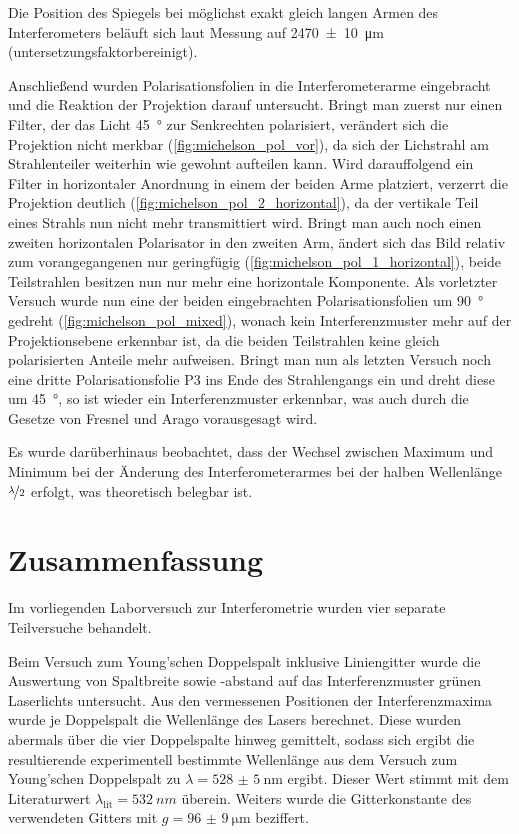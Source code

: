 \documentclass[ngerman]{scrartcl}
\begin{document}
Die Position des Spiegels bei möglichst exakt gleich langen Armen des Interferometers beläuft sich laut Messung auf \SI{2470(10)}{\micro\meter} (untersetzungsfaktorbereinigt).

Anschließend wurden Polarisationsfolien in die Interferometerarme eingebracht und die Reaktion der Projektion darauf untersucht. Bringt man zuerst nur einen Filter, der das Licht \SI{45}{\degree} zur Senkrechten polarisiert, verändert sich die Projektion nicht merkbar (\autoref{fig:michelson_pol_vor}), da sich der Lichstrahl am Strahlenteiler weiterhin wie gewohnt aufteilen kann. Wird darauffolgend ein Filter in horizontaler Anordnung in einem der beiden Arme platziert, verzerrt die Projektion deutlich (\autoref{fig:michelson_pol_2_horizontal}), da der vertikale Teil eines Strahls nun nicht mehr transmittiert wird. Bringt man auch noch einen zweiten horizontalen Polarisator in den zweiten Arm, ändert sich das Bild relativ zum vorangegangenen nur geringfügig (\autoref{fig:michelson_pol_1_horizontal}), beide Teilstrahlen besitzen nun nur mehr eine horizontale Komponente. Als vorletzter Versuch wurde nun eine der beiden eingebrachten Polarisationsfolien um \SI{90}{\degree} gedreht (\autoref{fig:michelson_pol_mixed}), wonach kein Interferenzmuster mehr auf der Projektionsebene erkennbar ist, da die beiden Teilstrahlen keine gleich polarisierten Anteile mehr aufweisen. Bringt man nun als letzten Versuch noch eine dritte Polarisationsfolie P3 ins Ende des Strahlengangs ein und dreht diese um \SI{45}{\degree}, so ist wieder ein Interferenzmuster erkennbar, was auch durch die Gesetze von Fresnel und Arago vorausgesagt wird.

Es wurde darüberhinaus beobachtet, dass der Wechsel zwischen Maximum und Minimum bei der Änderung des Interferometerarmes bei der halben Wellenlänge $\nicefrac{\lambda}{2}$ erfolgt, was theoretisch belegbar ist.



\section{Zusammenfassung}
\label{sec:zusammenfassung}

Im vorliegenden Laborversuch zur Interferometrie wurden vier separate Teilversuche behandelt.

Beim Versuch zum Young'schen Doppelspalt inklusive Liniengitter wurde die Auswertung von Spaltbreite sowie -abstand auf das Interferenzmuster grünen Laserlichts untersucht. Aus den vermessenen Positionen der Interferenzmaxima wurde je Doppelspalt die Wellenlänge des Lasers berechnet. Diese wurden abermals über die vier Doppelspalte hinweg gemittelt, sodass sich ergibt die resultierende experimentell bestimmte Wellenlänge aus dem Versuch zum Young'schen Doppelspalt zu \(\lambda = \SI{528(5)}{\nano\meter}\) ergibt. Dieser Wert stimmt mit dem Literaturwert $\lambda_{\text{lit}}=\SI{532}{nm}$ überein. Weiters wurde die Gitterkonstante des verwendeten Gitters mit \(g = \SI{96(9)}{\micro\meter}\) beziffert.
\end{document}
